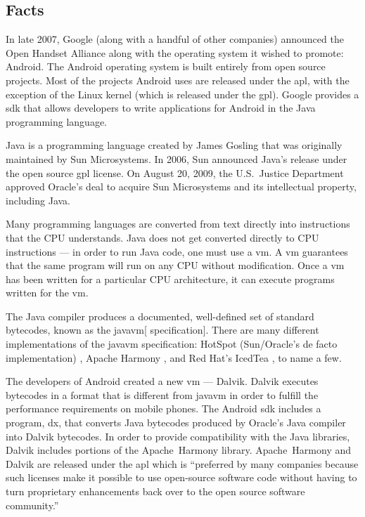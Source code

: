 \documentclass[11pt]{article}
\begin{document}
\begin{multicols}{2}
\setcounter{page}{1}

\section{Facts} %
\label{sec:facts}

In late 2007, Google (along with a handful of other companies) announced the
Open Handset Alliance \cite{open-handset-alliance-ann} along with the operating
system it wished to promote: Android.  The Android operating system is built
entirely from open source projects.  Most of the projects Android uses are
released under the \gls{apl}, with the exception of the Linux kernel (which is
released under the \gls{gpl}).  Google provides a \gls{sdk} that allows
developers to write applications for Android in the Java programming language.

Java is a programming language created by James Gosling that was originally
maintained by Sun Microsystems.  In 2006, Sun announced Java's release under the
open source \gls{gpl} license. \cite{sun-open-sources-java} On August 20, 2009,
the U.S.~Justice Department approved Oracle's deal to acquire Sun Microsystems
and its intellectual property, including Java. \cite{oracle-buys-sun}

Many programming languages are converted from text directly into instructions
that the CPU understands.  Java does not get converted directly to CPU
instructions --- in order to run Java code, one must use a \gls{vm}.  A \gls{vm}
guarantees that the same program will run on any CPU without modification.  Once
a \gls{vm} has been written for a particular CPU architecture, it can execute
programs written for the \gls{vm}.

The Java compiler produces a documented, well-defined set of standard
\glspl{bytecode}, known as the \gls{javavm}[ specification]. \cite[Chapter
4]{javavm-bytecode}  There are many different implementations of the
\gls{javavm} specification: HotSpot (Sun/Oracle's de facto implementation)
\cite{hotspot}, Apache Harmony \cite{apache-harmony}, and Red Hat's IcedTea
\cite{icedtea}, to name a few.

The developers of Android created a new \gls{vm} --- Dalvik.  Dalvik executes
\glspl{bytecode} in a format that is different from \gls{javavm} in order to
fulfill the performance requirements on mobile phones.  \cite{dalvik-bytecode}
\cite{dalvik-vm-arch} The Android \gls{sdk} includes a program, dx, that
converts Java \glspl{bytecode} produced by Oracle's Java compiler into Dalvik
\glspl{bytecode}.  \cite{android-sdk-building} In order to provide compatibility
with the Java libraries, Dalvik includes portions of the Apache~Harmony library.
\cite{apache-harmony} \cite{dalvik-readme}  Apache~Harmony and Dalvik are
released under the \gls{apl} \cite{apache-license} which is ``preferred by many
companies because such licenses make it possible to use open-source software
code without having to turn proprietary enhancements back over to the open
source software community.'' \cite{why-apache2-license}


\end{multicols}
\end{document}
